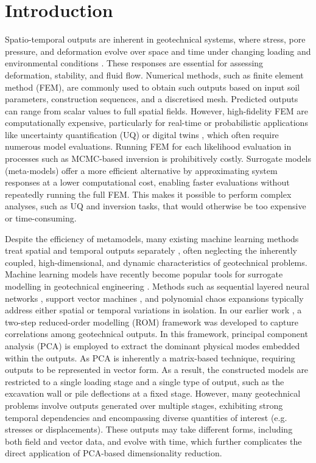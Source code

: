 \section{Introduction}\label{sec: intro}\noindent
Spatio-temporal outputs are inherent in geotechnical systems, where stress, pore pressure, and deformation evolve over space and time under changing loading and environmental conditions \parencite{phoon2020,qin2021,shi2021,chen2023,phoon2023,gatto2023}. These responses are essential for assessing deformation, stability, and fluid flow. Numerical methods, such as finite element method (FEM), are commonly used to obtain such outputs based on input soil parameters, construction sequences, and a discretised mesh. Predicted outputs can range from scalar values to full spatial fields. However, high-fidelity FEM are computationally expensive, particularly for real-time or probabilistic applications like uncertainty quantification (UQ) or digital twins \parencite{kapteyn2021,torzoni2024,tian2025}, which often require numerous model evaluations. Running FEM for each likelihood evaluation in processes such as MCMC-based inversion is prohibitively costly. Surrogate models (meta-models) offer a more efficient alternative by approximating system responses at a lower computational cost, enabling faster evaluations without repeatedly running the full FEM. This makes it possible to perform complex analyses, such as UQ and inversion tasks, that would otherwise be too expensive or time-consuming. 

Despite the efficiency of metamodels, many existing machine learning methods treat spatial and temporal outputs separately \parencite{bardet2009,low2014,sotiropoulos2016,zhao2021,phoon2022,chen2024}, often neglecting the inherently coupled, high-dimensional, and dynamic characteristics of geotechnical problems. Machine learning models have recently become popular tools for surrogate modelling in geotechnical engineering \parencite{zhang2022,wang2023,wang2025-1,wang2025-2, tian2025,zhang2025}. Methods such as sequential layered neural networks \parencite{chen2024,yaghoubi2024}, support vector machines \parencite{goh2007,tinoco2014}, and polynomial chaos expansions \parencite{pan2017,pan2020,mohammadi2023} typically address either spatial or temporal variations in isolation. In our earlier work \parencite{yang2024}, a two-step reduced-order modelling (ROM) framework was developed to capture correlations among geotechnical outputs. In this framework, principal component analysis (PCA) is employed to extract the dominant physical modes embedded within the outputs. As PCA is inherently a matrix-based technique, requiring outputs to be represented in vector form. As a result, the constructed models are restricted to a single loading stage and a single type of output, such as the excavation wall or pile deflections at a fixed stage. However, many geotechnical problems involve outputs generated over multiple stages, exhibiting strong temporal dependencies and encompassing diverse quantities of interest (e.g. stresses or displacements). These outputs may take different forms, including both field and vector data, and evolve with time, which further complicates the direct application of PCA-based dimensionality reduction. 

